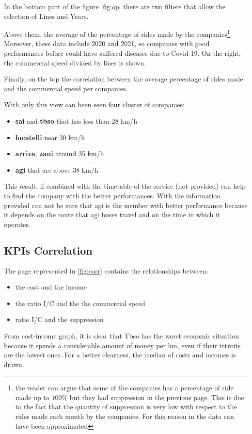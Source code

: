 In the bottom part of the figure \ref{fig:op} there are two filters that allow the selection of Lines and Years.

Above them,  the average of the percentage of rides made by the companies\footnote{the reader can argue that some of the companies has a percentage of ride made up to $100\%$ but they had suppression in the previous page. This is due to the fact that the quantity of suppression is very low with respect to the rides made each month by the companies. For this reason in the data can have been approximated}. Moreover, these data include 2020 and 2021, so companies with good performances before could have suffered diseases due to Covid-19. On the right, the commercial speed divided by lines is shown.

Finally, on the top the correlation between the average percentage of rides made and the commercial speed per companies.

With only this view can been seen four cluster of companies:
\begin{itemize}
    \item \textbf{sai} and \textbf{tbso} that has less than 28 km/h
    \item \textbf{locatelli} near 30 km/h
    \item \textbf{arriva}, \textbf{zani} around 35 km/h
    \item \textbf{agi} that are above 38 km/h 
\end{itemize}
This result, if combined with the timetable of the service (not provided) can help to find the company with the better performances. With the information provided can not be sure that agi is the member with better performance because it depends on the route that agi buses travel and on the time in which it operates. 



\newpage
\begin{landscape}
\thispagestyle{empty}

\end{landscape}
\newpage

\subsection{KPIs Correlation}
The page represented in \ref{fig:corr} contains the relationships between:
\begin{itemize}
  \item the cost and the income
   \item the ratio I/C and the the commercial speed
    \item ratio I/C and the suppression
\end{itemize}
From cost-income graph, it is clear that Tbso has the worst economic situation because it spends a considerable amount of money per km, even if their introits are the lowest ones. For a better clearness, the median of costs and incomes is drawn.

